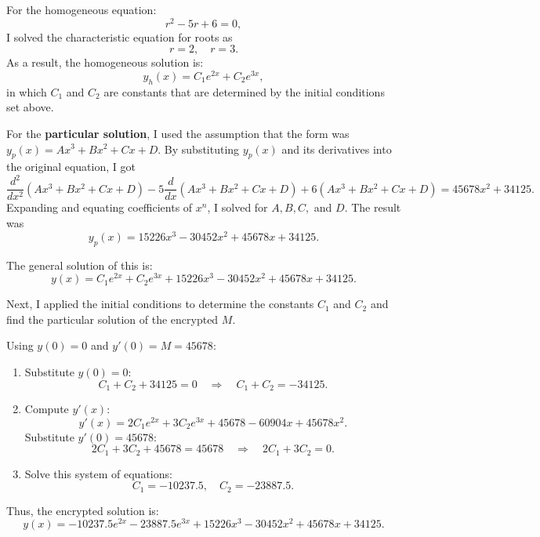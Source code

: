 \documentclass[12pt]{article}
\begin{document}
\vspace {0.1in}

For the homogeneous equation:
\[
r^2 - 5r + 6 = 0,
\]
I solved the characteristic equation for roots as
\[
r = 2, \quad r = 3.
\]
As a result, the homogeneous solution is:
\[
y_h(x) = C_1e^{2x} + C_2e^{3x},
\]
in which \( C_1 \) and \( C_2 \) are constants that are determined by the initial conditions set above.

\raggedright
\setlength{\parindent}{0.5in} %

\vspace {0.1in}


For the \textbf{particular solution}, I used the assumption that the form was \( y_p(x) = Ax^3 + Bx^2 + Cx + D \). By substituting \( y_p(x) \) and its derivatives into the original equation, I got
\[
\frac{d^2}{dx^2}(Ax^3 + Bx^2 + Cx + D) - 5\frac{d}{dx}(Ax^3 + Bx^2 + Cx + D) + 6(Ax^3 + Bx^2 + Cx + D) = 45678x^2 + 34125.
\]
\centering Expanding and equating coefficients of \( x^n \), I solved for \( A, B, C, \) and \( D \). The result was
\[
y_p(x) = 15226x^3 - 30452x^2 + 45678x + 34125.
\]

The general solution of this is:
\[
y(x) = C_1e^{2x} + C_2e^{3x} + 15226x^3 - 30452x^2 + 45678x + 34125.
\]

\raggedright
\setlength{\parindent}{0.5in} %

Next, I applied the initial conditions to determine the constants \( C_1 \) and \( C_2 \) and find the particular solution of the encrypted \( M \).

Using \( y(0) = 0 \) and \( y'(0) = M = 45678 \):
\begin{enumerate}
    \item Substitute \( y(0) = 0 \):
    \[
    C_1 + C_2 + 34125 = 0 \quad \Rightarrow \quad C_1 + C_2 = -34125.
    \]

    \item Compute \( y'(x) \):
    \[
    y'(x) = 2C_1e^{2x} + 3C_2e^{3x} + 45678 - 60904x + 45678x^2.
    \]
    Substitute \( y'(0) = 45678 \):
    \[
    2C_1 + 3C_2 + 45678 = 45678 \quad \Rightarrow \quad 2C_1 + 3C_2 = 0.
    \]

    \item Solve this system of equations:
    \[
    C_1 = -10237.5, \quad C_2 = -23887.5.
    \]
\end{enumerate}

Thus, the encrypted solution is:
\[
y(x) = -10237.5e^{2x} - 23887.5e^{3x} + 15226x^3 - 30452x^2 + 45678x + 34125.
\]
\end{document}
